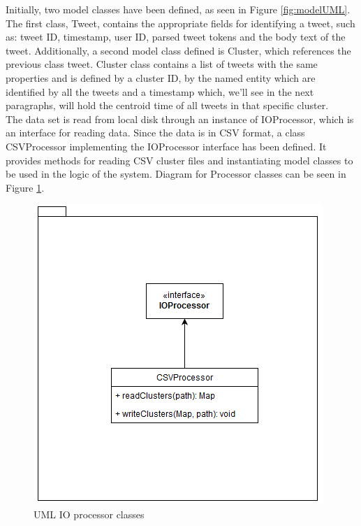 \documentclass[a4paper,portrait,12pt]{article}
\begin{document}
Initially, two model classes have been defined, as seen in Figure \ref{fig:modelUML}.
The first class, Tweet, contains the appropriate fields for identifying a tweet, such as: tweet ID, timestamp, user ID, parsed tweet tokens and the body text of the tweet.
Additionally, a second model class defined is Cluster, which references the previous class tweet. Cluster class contains a list of tweets with the same properties and is defined by a cluster ID, by the named entity which are identified by all the tweets and a timestamp which, we'll see in the next paragraphs, will hold the centroid time of all tweets in that specific cluster.\\

The data set is read from local disk through an instance of IOProcessor, which is an interface for reading data.
Since the data is in CSV format, a class CSVProcessor implementing the IOProcessor interface has been defined.
It provides methods for reading CSV cluster files and instantiating model classes to be used in the logic of the system.
Diagram for Processor classes can be seen in Figure \ref{fig:processorUML}. \\

\begin{figure}[h!]
	\centering
	\includegraphics[width=0.5\linewidth]{images/processorUML.png}
	\caption{UML IO processor classes}
	\label{fig:processorUML}
\end{figure}
\end{document}
